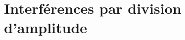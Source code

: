 \documentclass[11pt,fleqn]{book} %
\begin{document}










\setcounter{chapter}{8}

\chapter{Interférences par division d'amplitude}
\end{document}
